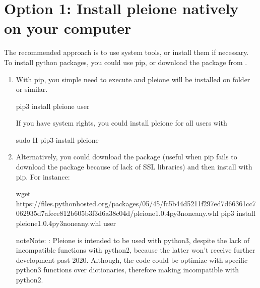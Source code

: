 \documentclass[letterpaper,10pt,english]{sphinxmanual}
\begin{document}
\section{Option 1: Install pleione natively on your computer}
\label{\detokenize{Installation:option-1-install-pleione-natively-on-your-computer}}
The recommended approach is to use system tools, or install them if
necessary. To install python packages, you could use pip, or download
the package from .
\begin{enumerate}
\def\theenumi{\arabic{enumi}}
\def\labelenumi{\theenumi .}
\makeatletter\def\p@enumii{\p@enumi \theenumi .}\makeatother
\item {} 

With pip, you simple need to execute and pleione will be installed on
 folder or similar.

\begin{sphinxVerbatim}[commandchars=\\\{\}]
pip3 install pleione \PYGZhy{}\PYGZhy{}user
\end{sphinxVerbatim}

If you have system rights, you could install pleione for all users with

\begin{sphinxVerbatim}[commandchars=\\\{\}]
sudo \PYGZhy{}H pip3 install pleione
\end{sphinxVerbatim}

\item {} 

Alternatively, you could download the package (useful when pip fails to download
the package because of lack of SSL libraries) and then install with pip. For instance:

\begin{sphinxVerbatim}[commandchars=\\\{\}]
wget https://files.pythonhosted.org/packages/05/45/fc5b44d5211f297ed7d66361cc7062935d7afece812b605b3f3d6a38c04d/pleione\PYGZhy{}1.0.4\PYGZhy{}py3\PYGZhy{}none\PYGZhy{}any.whl
pip3 install pleione\PYGZhy{}1.0.4\PYGZhy{}py3\PYGZhy{}none\PYGZhy{}any.whl \PYGZhy{}\PYGZhy{}user
\end{sphinxVerbatim}

\begin{sphinxadmonition}{note}{Note:}
:
Pleione is intended to be used with python3, despite the lack of
incompatible functions with python2, because the latter won’t receive
further development past 2020. Although, the code could be optimize with
specific python3 functions over dictionaries, therefore making incompatible
with python2.
\end{sphinxadmonition}


\end{enumerate}
\end{document}

